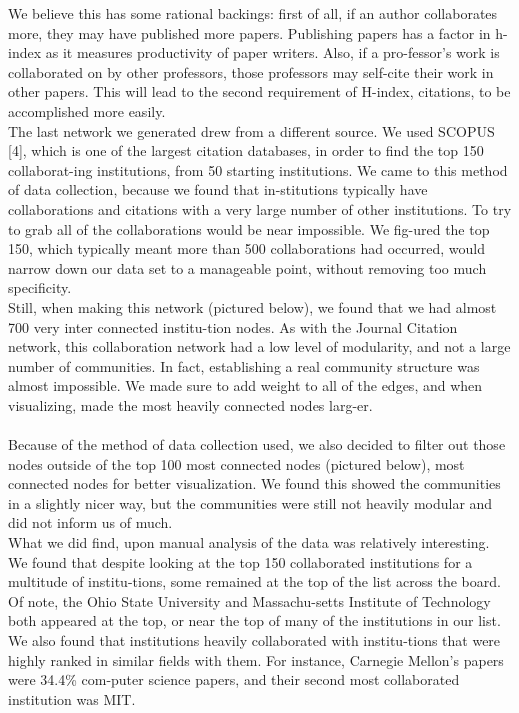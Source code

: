 \documentclass[times, 10pt,twocolumn]{article}
\begin{document}
We believe this has some rational backings: first of all, if an author collaborates more, they may have published more papers. Publishing papers has a factor in h-index as it measures productivity of paper writers. Also, if a pro-fessor’s work is collaborated on by other professors, those professors may self-cite their work in other papers. This will lead to the second requirement of H-index, citations, to be accomplished more easily. \\
The last network we generated drew from a different source. We used SCOPUS [4], which is one of the largest citation databases, in order to find the top 150 collaborat-ing institutions, from 50 starting institutions. We came to this method of data collection, because we found that in-stitutions typically have collaborations and citations with a very large number of other institutions. To try to grab all of the collaborations would be near impossible. We fig-ured the top 150, which typically meant more than 500 collaborations had occurred, would narrow down our data set to a manageable point, without removing too much specificity. \\
Still, when making this network (pictured below), we found that we had almost 700 very inter connected institu-tion nodes. As with the Journal Citation network, this collaboration network had a low level of modularity, and not a large number of communities. In fact, establishing a real community structure was almost impossible. We made sure to add weight to all of the edges, and when visualizing, made the most heavily connected nodes larg-er. \\
 \\
Because of the method of data collection used, we also decided to filter out those nodes outside of the top 100 most connected nodes (pictured below), most connected nodes for better visualization.  We found this showed the communities in a slightly nicer way, but the communities were still not heavily modular and did not inform us of much.    \\
What we did find, upon manual analysis of the data was relatively interesting. We found that despite looking at the top 150 collaborated institutions for a multitude of institu-tions, some remained at the top of the list across the board. Of note, the Ohio State University and Massachu-setts Institute of Technology both appeared at the top, or near the top of many of the institutions in our list. We also found that institutions heavily collaborated with institu-tions that were highly ranked in similar fields with them. For instance, Carnegie Mellon’s papers were 34.4\% com-puter science papers, and their second most collaborated institution was MIT. \\
\end{document}
